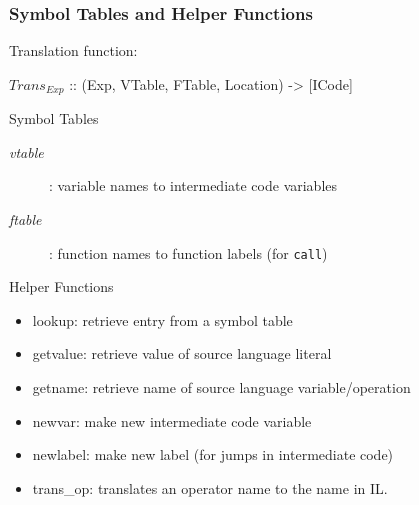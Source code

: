 \documentclass{beamer}
\newcommand{\codesize}{\footnotesize}
\newcommand{\cd}[1]{{{\codesize\tt #1}}}
\renewcommand{\emph}[1]{\textcolor{structure}{#1}}
\newcommand{\emp}[1]{\textcolor{DikuRed}{ #1}}
\newcommand{\mymath}[1]{$ #1 $}
\newcommand{\myindx}[1]{_{#1}}
\begin{document}
\begin{frame}[fragile, t]
	\frametitle{Symbol Tables and Helper Functions}

Translation function:

\begin{colorcode}
\mymath{Trans\myindx{Exp}} :: (Exp, VTable, FTable, Location) -> [ICode]
\end{colorcode}

\emph{Symbol Tables}
\begin{description}
\item[\emp{\em vtable}]: 
	variable names to intermediate code variables

\item[\emp{\em ftable}]: 
	function names to function labels (for \cd{call})
\end{description}

\bigskip

\emph{Helper Functions}
\begin{itemize}
\item \emp{lookup}: retrieve entry from a symbol table
\item \emp{getvalue}: retrieve value of source language literal
\item \emp{getname}: retrieve name of source language variable/operation
\item \emp{newvar}: make new intermediate code variable
\item \emp{newlabel}: make new label (for jumps in intermediate code)
\item \emp{trans\_op}: translates an operator name to the name in \textsc{IL}.
\end{itemize}

\end{frame}

\newcommand{\concat}{\mbox{\tt ~@~}}%
\end{document}
